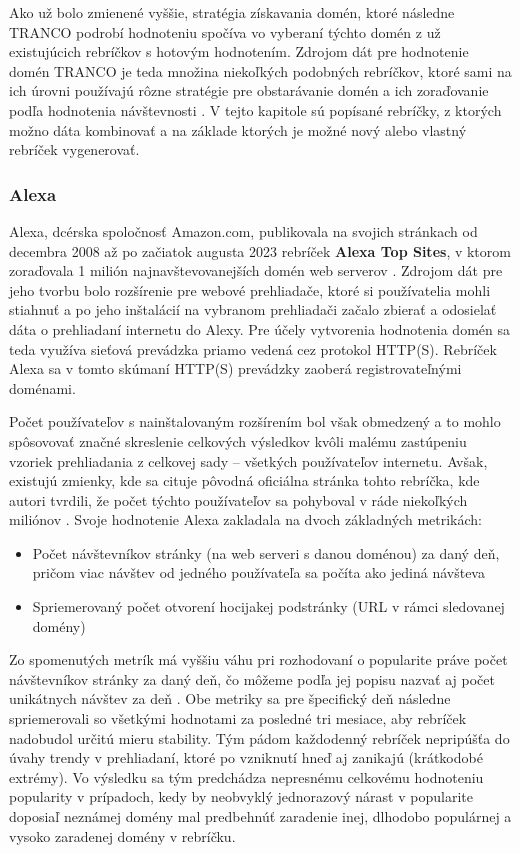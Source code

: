 Ako už bolo zmienené vyššie, stratégia získavania domén, ktoré následne TRANCO podrobí hodnoteniu spočíva vo vyberaní týchto domén z už existujúcich rebríčkov s hotovým hodnotením. 
Zdrojom dát pre hodnotenie domén TRANCO je teda množina niekoľkých podobných rebríčkov, ktoré sami na ich úrovni používajú rôzne stratégie pre obstarávanie domén a ich zoraďovanie 
podľa hodnotenia návštevnosti \cite{tranco-methodology}. 
V tejto kapitole sú popísané rebríčky, z ktorých možno dáta kombinovať 
a na základe ktorých je možné nový alebo vlastný rebríček vygenerovať.

\subsubsection{Alexa}

Alexa, dcérska spoločnosť Amazon.com, publikovala na svojich stránkach od decembra 2008 až po začiatok augusta 2023 rebríček \textbf{Alexa Top Sites}, v ktorom zoraďovala 1 milión 
najnavštevovanejších domén web serverov \cite{tranco-methodology}.
Zdrojom dát pre jeho tvorbu bolo rozšírenie pre webové prehliadače, ktoré si používatelia mohli stiahnuť a po jeho inštalácií na vybranom prehliadači začalo zbierať a odosielať
dáta o prehliadaní internetu do Alexy. 
Pre účely vytvorenia hodnotenia domén sa teda využíva sieťová prevádzka priamo vedená cez protokol HTTP(S). 
Rebríček Alexa sa v tomto skúmaní HTTP(S) prevádzky zaoberá registrovateľnými doménami. 

Počet používateľov s nainštalovaným rozšírením bol však obmedzený 
a to mohlo spôsovovať značné skreslenie celkových výsledkov kvôli malému zastúpeniu vzoriek prehliadania z celkovej sady -- všetkých používateľov internetu. 
Avšak, existujú zmienky, kde sa cituje pôvodná oficiálna stránka tohto rebríčka, kde autori tvrdili, že počet týchto používateľov sa pohyboval v ráde niekoľkých miliónov \cite{tranco}.
Svoje hodnotenie Alexa zakladala na dvoch základných metrikách: \cite{kinsta-alexa-rank-article, tranco}
\begin{itemize}
    \item Počet návštevníkov stránky (na web serveri s danou doménou) za daný deň, pričom viac návštev od jedného používateľa sa počíta ako jediná návšteva
    \item Spriemerovaný počet otvorení hocijakej podstránky (URL v rámci sledovanej domény)
\end{itemize}

Zo spomenutých metrík má vyššiu váhu pri rozhodovaní o popularite práve počet návštevníkov stránky za daný deň, čo môžeme podľa jej popisu nazvať aj počet unikátnych návštev za deň \cite{tranco}.
Obe metriky sa pre špecifický deň následne spriemerovali so všetkými hodnotami za posledné tri mesiace, aby rebríček nadobudol určitú mieru stability. 
Tým pádom každodenný rebríček nepripúšťa do úvahy trendy v prehliadaní, ktoré po vzniknutí hneď aj zanikajú (krátkodobé extrémy). 
Vo výsledku sa tým predchádza nepresnému celkovému hodnoteniu popularity v prípadoch, 
kedy by neobvyklý jednorazový nárast v popularite doposiaľ neznámej domény mal predbehnúť zaradenie inej, dlhodobo populárnej a vysoko zaradenej domény v rebríčku. 

